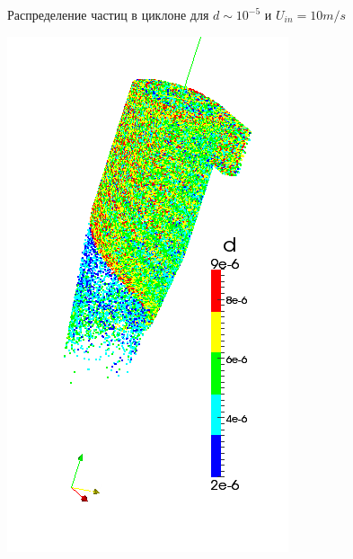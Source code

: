 \begin{figure}[h]
\begin{minipage}{0.475\linewidth}
		\caption{Распределение частиц в циклоне для $d \sim 10^{-5}$ и $U_{in} = 10m/s$}
		\label{fig:parcelsCyclone4}
	\end{minipage}
\end{figure}
\clearpage
 \begin{figure}[h]
 	\centering
 	\vspace{-4em}
 	\hspace{-1em}
	\begin{minipage}{0.2\linewidth}
		\includegraphics[scale=0.3]{t1}
	\end{minipage}
	\hspace{-1em}
	\begin{minipage}{0.2\linewidth}

\end{minipage}
\end{figure}
